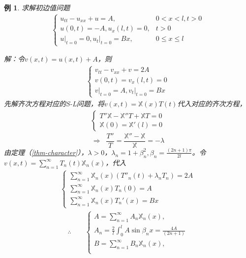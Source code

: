 \documentclass[11pt, a4paper]{article}
\theoremstyle{theorem}
\newtheorem{eg}[thm]{例}
\begin{document}
\begin{eg} 求解初边值问题
\begin{align}
    \begin{cases}
    u_{tt} - u_{xx} + u = A, \quad \quad &0 < x < l, t > 0 \\
    u(0,t) = -A, u_x(l,t) = 0, & t > 0 \\
    u\bigg|_{t = 0} = 0, u_t\bigg|_{t = 0} = Bx, & 0 \leq x \leq l
    \end{cases}
\end{align}

解：令$v(x,t) = u(x,t) + A$，则
\begin{align*}
    \begin{cases}
    v_{tt} - v_{xx} + v = 2A \\
    v(0,t) = v_x(l,t) = 0 \\
    v\bigg|_{t = 0} = A, v_t \bigg|_{t = 0} = Bx
    \end{cases}
\end{align*}
先解齐次方程对应的S-L问题，将$v(x,t) = \mathbb{X}(x)T(t)$代入对应的齐次方程，
\begin{align*}
    \begin{cases}
    T'' \mathbb{X} - \mathbb{X}'' T + \mathbb{X} T = 0 \\
    \mathbb{X}(0) = \mathbb{X}'(l) = 0
    \end{cases}
\end{align*}
$$
\Rightarrow \; \; \frac{T''}{T} = \frac{\mathbb{X}'' - \mathbb{X}}{\mathbb{X}} = - \lambda
$$
由定理（\ref{thm-character}），$\lambda > 0$，$\lambda_n = 1 + \beta_n^2, \beta_n = \frac{(2n+1)\pi}{2l}$。令$v(x,t) = \sum_{n=1}^\infty T_n(t)\mathbb{X}_n(x) $，代入
\begin{align*}
    \begin{cases}
    \sum_{n=1}^\infty \mathbb{X}_n(x) \left(T''_n(t) + \lambda_n T_n\right) = 2A \\
    \sum_{n=1}^\infty \mathbb{X}_n(x) T_n(0) = A \\
    \sum_{n=1}^\infty \mathbb{X}_n(x) T_n'(x) = Bx
    \end{cases}
\end{align*}
\begin{align*}
\therefore \quad \quad
    \begin{cases}
    A = \sum_{n=1}^\infty A_n \mathbb{X}_n(x), \\
    A_n = \frac{2}{l} \int_0^l A \sin \beta_n x = \frac{4A}{(2n+1)} \\
    B = \sum_{n=1}^\infty B_n \mathbb{X}_n(x), \\

\end{cases}
\end{align*}
\end{eg}
\end{document}
